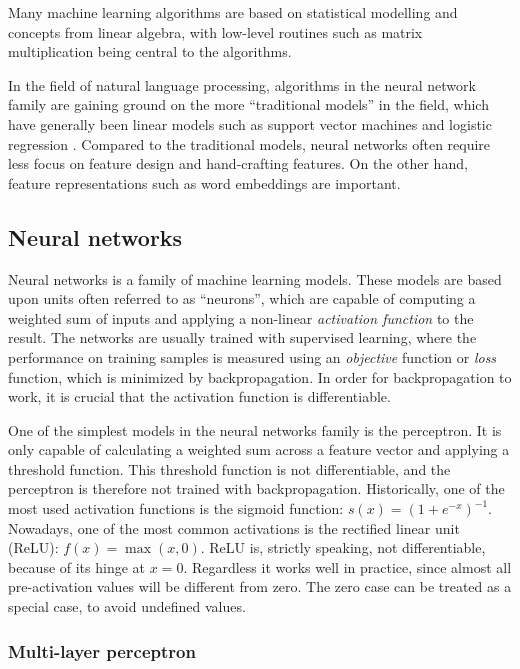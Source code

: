 Many machine learning algorithms are based on statistical modelling and
concepts from linear algebra, with low-level routines such as matrix
multiplication being central to the algorithms.

In the field of natural language processing, algorithms in the neural network
family are gaining ground on the more ``traditional models'' in the field,
which have generally been linear models such as support vector machines and
logistic regression \autocite[345]{goldberg2016primer}. Compared to the
traditional models, neural networks often require less focus on feature
design and hand-crafting features. On the other hand, feature representations
such as word embeddings are important.


\subsection{Neural networks}

Neural networks is a family of machine learning models. These models are
based upon units often referred to as ``neurons'', which are capable of
computing a weighted sum of inputs and applying a non-linear \emph{activation
function} to the result. The networks are usually trained with supervised
learning, where the performance on training samples is measured using an
\emph{objective} function or \emph{loss} function, which is minimized by
backpropagation. In order for backpropagation to work, it is crucial that the
activation function is differentiable.

One of the simplest models in the neural networks family is the perceptron.
It is only capable of calculating a weighted sum across a feature vector and
applying a threshold function. This threshold function is not differentiable,
and the perceptron is therefore not trained with backpropagation.
Historically, one of the most used activation functions is the sigmoid
function: \(s(x) = {(1 + e^{-x})^{-1}}\). Nowadays, one of the most common
activations is the rectified linear unit (ReLU): \(f(x) = \max(x, 0)\). ReLU
is, strictly speaking, not differentiable, because of its hinge at $x = 0$.
Regardless it works well in practice, since almost all pre-activation values
will be different from zero. The zero case can be treated as a special case,
to avoid undefined values.

\subsubsection{Multi-layer perceptron}

